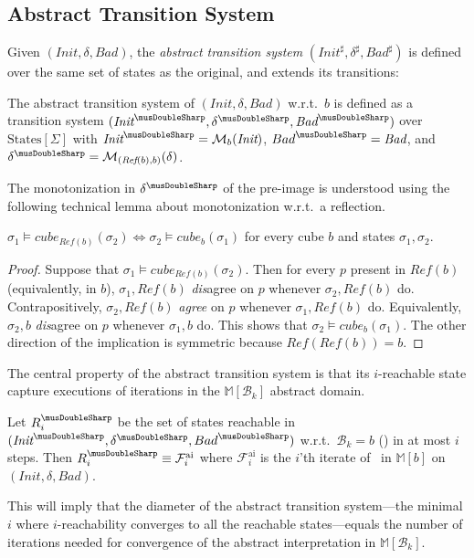 \documentclass[acmsmall,screen]{acmart}
\newcommand{\toolong}[1]{#1}
\newcommand{\toolong}[1]{}
\newcommand{\vocabulary}{\Sigma}
\newcommand{\voc}{\vocabulary}
\newcommand{\Init}{{\textit{Init}}}
\newcommand{\Bad}{\textit{Bad}}
\newcommand{\States}{{\mbox{States}}[\voc]}
\newcommand{\tr}{\delta}
\newcommand{\Frameai}{\mathcal{F}^{\text{ai}}}
\newcommand{\bkwrch}[1]{\mathcal{B}_{#1}}
\newcommand{\cubemon}[2]{\textit{cube}_{{#2}}({#1})}
\newcommand{\moncube}[2]{\cubemon{#1}{#2}}
\newcommand{\monox}[2]{\mathcal{M}_{#2}({#1})}
\newcommand{\abs}[1]{{#1}^{\sharp}}
\newcommand{\absr}[1]{{#1}^{\musDoubleSharp}}
\newcommand{\madom}[1]{\mathbb{M}[{#1}]}
\newcommand{\bkcube}{b}
\newcommand{\reflect}[1]{\textit{Ref}({#1})}
\begin{document}
\subsection{Abstract Transition System}
\label{sec:abstract-transition}
Given $(\Init,\tr,\Bad)$, the \emph{abstract transition system} $(\abs{\Init},\abs{\tr},\abs{\Bad})$ is defined over the same set of states as the original, and extends its transitions:
%
\begin{definition}
\label{def:abs-tr} %
The abstract transition system of $(\Init,\tr,\Bad)$ w.r.t.\ $\bkcube$
is defined as a transition system $(\absr{\Init},\absr{\tr},\absr{\Bad})$ over $\States$ with $\absr{\Init} = \monox{\Init}{\bkcube}$, $\absr{Bad} = \Bad$, and $\absr{\tr}=\monox{\tr}{(\reflect{\bkcube},\bkcube)}$.
%
%
\end{definition}
%

%

%
The monotonization in $\absr{\tr}$ of the pre-image is understood using the following technical lemma about monotonization w.r.t.\ a reflection.
%
%
%
%
\begin{lemma}
\label{lem:moncube-reflect}
$\sigma_1 \models \moncube{\sigma_2}{\reflect{\bkcube}} \iff \sigma_2 \models \moncube{\sigma_1}{\bkcube}$ for every cube $b$ and states $\sigma_1,\sigma_2$.
\end{lemma}
\toolong{
\begin{proof}
Suppose that $\sigma_1 \models \moncube{\sigma_2}{\reflect{\bkcube}}$.
Then for every $p$ present in $\reflect{\bkcube}$ (equivalently, in $\bkcube$), $\sigma_1,\reflect{\bkcube}$ \emph{dis}agree on $p$ whenever $\sigma_2,\reflect{\bkcube}$ do. Contrapositively, $\sigma_2,\reflect{\bkcube}$ \emph{agree} on $p$ whenever $\sigma_1,\reflect{\bkcube}$ do. Equivalently, $\sigma_2,\bkcube$ \emph{dis}agree on $p$ whenever $\sigma_1,\bkcube$ do. This shows that $\sigma_2 \models \moncube{\sigma_1}{\bkcube}$. The other direction of the implication is symmetric because $\reflect{\reflect{\bkcube}}=\bkcube$.
\end{proof}
}

The central property of the abstract transition system is that its $i$-reachable state capture executions of iterations in the $\madom{\bkwrch{k}}$ abstract domain.
\begin{lemma}
\label{thm:absract-reach}
%
%
Let $\absr{R}_i$ be the set of states reachable in $(\absr{\Init},\absr{\tr},\absr{Bad})$ w.r.t.\ $\bkwrch{k}=\bkcube$ () in at most $i$ steps.
Then $\absr{R}_i \equiv \Frameai_{i}$ where $\Frameai_{i}$ is the $i$'th iterate of~ in $\madom{\bkcube}$ on $(\Init,\tr,\Bad)$.
%
\end{lemma}
%
This will imply that the diameter of the abstract transition system---the minimal $i$ where $i$-reachability converges to all the reachable states---equals the number of iterations needed for convergence of the abstract interpretation in $\madom{\bkwrch{k}}$.
\end{document}
